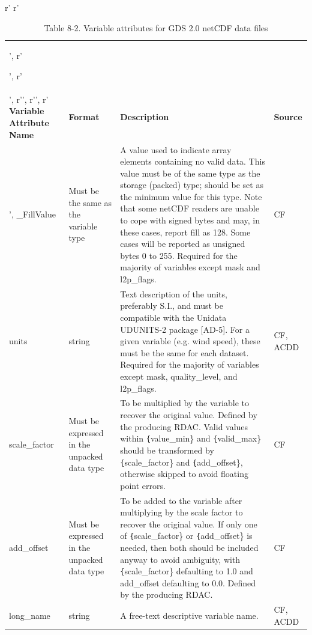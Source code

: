 r'%
r'\begin{longtable}{|p{}|p{}|p{}|p{}|}',
r'\caption{Table 8-2. Variable attributes for GDS 2.0 netCDF data files}',
r'\label{tab:variable-attributes} \\ ',
r'\hline \endhead',
r'\hline \endfoot',
r'\rowcolor{lightgray} \textbf{Variable Attribute Name} & \textbf{Format} & \textbf{Description} & \textbf{Source} \\ \hline',
\rowcolor{LightCyan} \_FillValue & Must be the same as the variable type & A value used to indicate array elements containing no valid data. This value must be of the same type as the storage (packed) type; should be set as the minimum value for this type. Note that some netCDF readers are unable to cope with signed bytes and may, in these cases, report fill as 128. Some cases will be reported as unsigned bytes 0 to 255. Required for the majority of variables except mask and l2p\_flags. & CF \\ \hline

\rowcolor{LightCyan} units & string & Text description of the units, preferably S.I., and must be compatible with the Unidata UDUNITS-2 package [AD-5]. For a given variable (e.g. wind speed), these must be the same for each dataset. Required for the majority of variables except mask, quality\_level, and l2p\_flags. & CF, ACDD \\ \hline

\rowcolor{LightCyan} scale\_factor & Must be expressed in the unpacked data type & To be multiplied by the variable to recover the
original value. Defined by the producing
RDAC. Valid values within \texttt\{value\_min\} and
\texttt\{valid\_max\} should be transformed by
\texttt\{scale\_factor\} and \texttt\{add\_offset\}, otherwise
skipped to avoid floating point errors. & CF \\ \hline

\rowcolor{LightCyan} add\_offset & Must be expressed in the unpacked data type & To be added to the variable after multiplying by the scale factor to recover the original value. If only one of \texttt\{scale\_factor\} or \texttt\{add\_offset\} is needed, then both should be included anyway to avoid ambiguity, with \texttt\{scale\_factor\} defaulting to 1.0 and add\_offset defaulting to 0.0. Defined by the producing RDAC. & CF \\ \hline

\rowcolor{LightCyan} long\_name & string & A free-text descriptive variable name. & CF, ACDD \\ \hline


\end{longtable}
